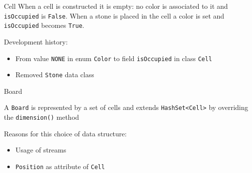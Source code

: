 \documentclass{beamer}
\begin{document}
\begin{frame}{Cell}
	When a cell is constructed it is empty: no color is associated to it and \texttt{isOccupied} is \texttt{False}. When a stone is placed in the cell a color is set and \texttt{isOccupied} becomes \texttt{True}.
	\vspace{0.5cm}

Development history:
\begin{itemize}
\item From value \texttt{NONE} in enum \texttt{Color} to field \texttt{isOccupied} in class \texttt{Cell}
\item Removed \texttt{Stone} data class
\end{itemize}


\end{frame}


\begin{frame}{Board}

A \texttt{Board} is represented by a set of cells and extends \texttt{HashSet<Cell>} by overriding the \texttt{dimension()} method

\vspace{0.5cm}
Reasons for this choice of data structure:
\begin{itemize}
    \item Usage of streams
    \item \texttt{Position} as attribute of \texttt{Cell}    
\end{itemize}





\end{frame}
\end{document}
